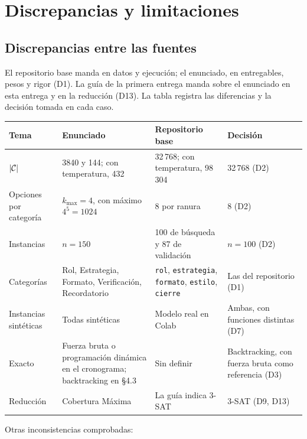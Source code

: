 \section{Discrepancias y limitaciones}
\label{sec:discrepancias}

\subsection{Discrepancias entre las fuentes}

El repositorio base manda en datos y ejecución; el enunciado, en entregables, pesos y rigor
(D1). La guía de la primera entrega manda sobre el enunciado en esta entrega y en la
reducción (D13). La tabla registra las diferencias y la decisión tomada en cada caso.

\begin{center}
\small
\begin{tabular}{p{2.5cm}p{4cm}p{4cm}p{3.5cm}}
\toprule
Tema & Enunciado & Repositorio base & Decisión \\
\midrule
$|\mathcal{C}|$ & 3840 y 144; con temperatura, 432 & 32\,768; con temperatura, 98\,304 & 32\,768 (D2) \\
Opciones por categoría & $k_{\max}=4$, con máximo $4^5=1024$ & 8 por ranura & 8 (D2) \\
Instancias & $n=150$ & 100 de búsqueda y 87 de validación & $n=100$ (D2) \\
Categorías & Rol, Estrategia, Formato, Verificación, Recordatorio & \texttt{rol}, \texttt{estrategia}, \texttt{formato}, \texttt{estilo}, \texttt{cierre} & Las del repositorio (D1) \\
Instancias sintéticas & Todas sintéticas & Modelo real en Colab & Ambas, con funciones distintas (D7) \\
Exacto & Fuerza bruta o programación dinámica en el cronograma; backtracking en §4.3 & Sin definir & Backtracking, con fuerza bruta como referencia (D3) \\
Reducción & Cobertura Máxima & La guía indica 3-SAT & 3-SAT (D9, D13) \\
\bottomrule
\end{tabular}
\end{center}

Otras inconsistencias comprobadas:

